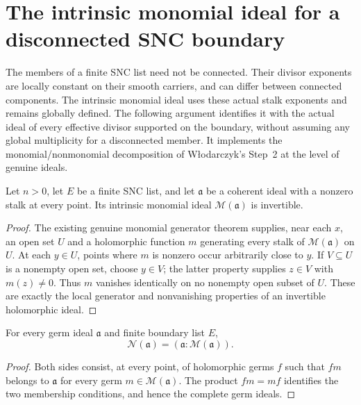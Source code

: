 \section{The intrinsic monomial ideal for a disconnected SNC boundary}
\label{sec:hironaka-snc-supported-monomial-ideal}

The members of a finite SNC list need not be connected.  Their divisor
exponents are locally constant on their smooth carriers, and can differ
between connected components.  The intrinsic monomial ideal uses these
actual stalk exponents and remains globally defined.  The following
argument identifies it with the actual ideal of every effective divisor
supported on the boundary, without assuming any global multiplicity for
a disconnected member.  It implements the monomial/nonmonomial
decomposition of W{\l}odarczyk's Step~2 at the level of genuine ideals.

\begin{lemma}
\label{hir:intrinsic-monomial-invertible}
\leanok
Let $n>0$, let $E$ be a finite SNC list, and let $\mathfrak a$ be a
coherent ideal with a nonzero stalk at every point.  Its intrinsic
monomial ideal $\mathcal M(\mathfrak a)$ is invertible.
\end{lemma}
\begin{proof}
The existing genuine monomial generator theorem supplies, near each
$x$, an open set $U$ and a holomorphic function $m$ generating every
stalk of $\mathcal M(\mathfrak a)$ on $U$.  At each $y\in U$, points
where $m$ is nonzero occur arbitrarily close to $y$.
If $V\subseteq U$ is a nonempty open set, choose $y\in V$; the latter
property supplies $z\in V$ with $m(z)\ne0$.
Thus $m$ vanishes identically on no nonempty open subset of $U$.
These are exactly the local generator and nonvanishing properties of
an invertible holomorphic ideal.
\end{proof}

\begin{lemma}
\label{hir:intrinsic-nonmonomial-colon}
\leanok
For every germ ideal $\mathfrak a$ and finite boundary list $E$,
\[
 \mathcal N(\mathfrak a)=
 (\mathfrak a:\mathcal M(\mathfrak a)).
\]
\end{lemma}
\begin{proof}
Both sides consist, at every point, of holomorphic germs $f$ such that
$fm$ belongs to $\mathfrak a$ for every germ
$m\in\mathcal M(\mathfrak a)$.  The product $fm=mf$ identifies the two
membership conditions, and hence the complete germ ideals.
\end{proof}


